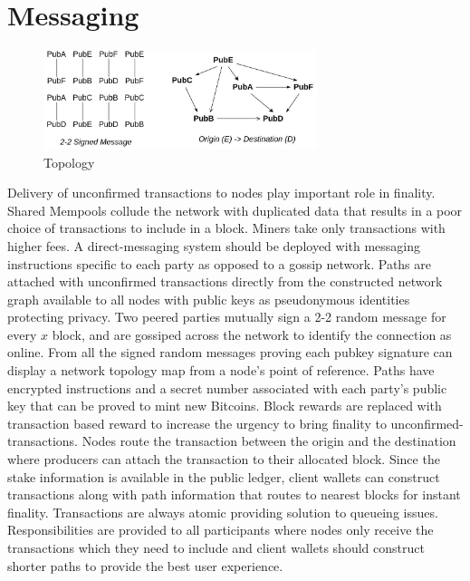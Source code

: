 \documentclass[a4paper,10pt]{article}
\begin{document}
\section{Messaging}
\begin{figure}[H]
\begin{center}
\includegraphics[width=8cm]{topology}
\caption{Topology}
\end{center}
\end{figure}
Delivery of unconfirmed transactions to nodes play important role in finality. Shared Mempools collude the network with duplicated data that results in a poor choice of transactions to include in a block. Miners take only transactions with higher fees. A direct-messaging system should be deployed with messaging instructions specific to each party as opposed to a gossip network. Paths are attached with unconfirmed transactions directly from the constructed network graph available to all nodes with public keys as pseudonymous identities protecting privacy. Two peered parties mutually sign a 2-2 random message for every $x$ block, and are gossiped across the network to identify the connection as online. From all the signed random messages proving each pubkey signature can display a network topology map from a node's point of reference. Paths have encrypted instructions and a secret number associated with each party's public key that can be proved to mint new Bitcoins. Block rewards are replaced with transaction based reward to increase the urgency to bring finality to unconfirmed-transactions. Nodes route the transaction between the origin and the destination where producers can attach the transaction to their allocated block. Since the stake information is available in the public ledger, client wallets can construct transactions along with path information that routes to nearest blocks for instant finality. Transactions are always atomic providing solution to queueing issues. Responsibilities are provided to all participants where nodes only receive the transactions which they need to include and client wallets should construct shorter paths to provide the best user experience.
\end{document}
